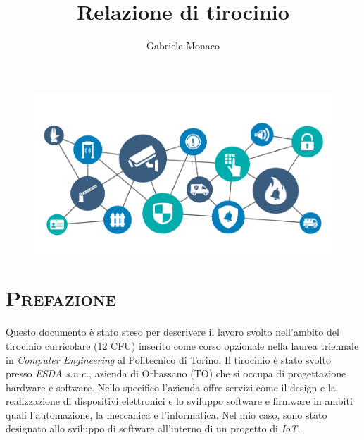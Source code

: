 \documentclass[a4paper,12pt]{article}
\title{\textbf{Relazione di tirocinio}}
\author{Gabriele Monaco}
\begin{document}
\pagestyle{fancy}
\fancyhf{}
\lhead{\thetitle}
\rhead{\theauthor}
\cfoot{\thepage}

\maketitle

\begin{figure}[h]
  \includegraphics[width=\textwidth]{header}
\end{figure}

\newpage

\tableofcontents

\newpage

\setlength{\emergencystretch}{15pt}
\setlength{\parindent}{0pt}
\renewcommand{\headrulewidth}{1sp}

\section{\textsc{Prefazione}}

Questo documento \`e stato steso per descrivere il lavoro svolto nell'ambito del tirocinio curricolare (12 CFU) inserito come corso opzionale nella laurea triennale in \textit{Computer Engineering} al Politecnico di Torino. Il tirocinio \`e stato svolto presso \textit{ESDA s.n.c.}, azienda di Orbassano (TO) che si occupa di progettazione hardware e software. Nello specifico l'azienda offre servizi come il design e la realizzazione di dispositivi elettronici e lo sviluppo software e firmware in ambiti quali l'automazione, la meccanica e l'informatica. Nel mio caso, sono stato designato allo sviluppo di software all'interno di un progetto di \textit{IoT}.
\end{document}
